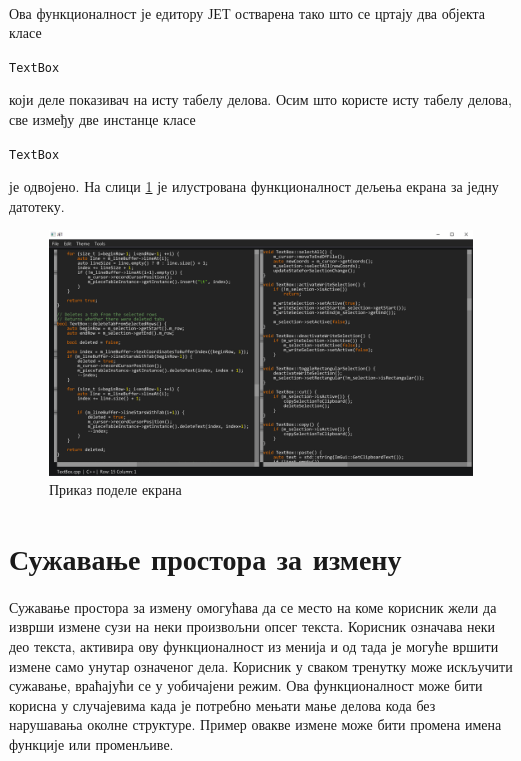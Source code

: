 \documentclass[12pt,oneside]{memoir}
\begin{document}
\paragraph{}
Ова функционалност је едитору ЈЕТ остварена тако што
се цртају два објекта класе \begin{latinica}\verb|TextBox|\end{latinica}
који деле показивач на исту табелу делова. Осим што користе исту табелу
делова, све између две инстанце класе \begin{latinica}\verb|TextBox|\end{latinica}  је одвојено.
На слици \ref{fig:split_screen} је илустрована функционалност дељења екрана
за једну датотеку.

\begin{figure}[!ht]
	\centering
	\includegraphics[width=1.0\textwidth]{images/split_screen.png}
	\caption{Приказ поделе екрана}
	\label{fig:split_screen}
\end{figure}


\section{Сужавање простора за измену}

\paragraph{}
Сужавање простора за измену омогућава да се место на коме корисник жели да изврши
измене сузи на неки произвољни опсег текста. Корисник означава неки део текста,
активира ову функционалност из менија и од тада је могуће вршити измене само
унутар означеног дела. Корисник у сваком тренутку може искључити сужавање, враћајући се у уобичајени режим. Ова функционалност може бити корисна у
случајевима када је потребно мењати мање делова кода без нарушавања околне
структуре. Пример овакве измене може бити промена имена функције или променљиве.
\end{document}
